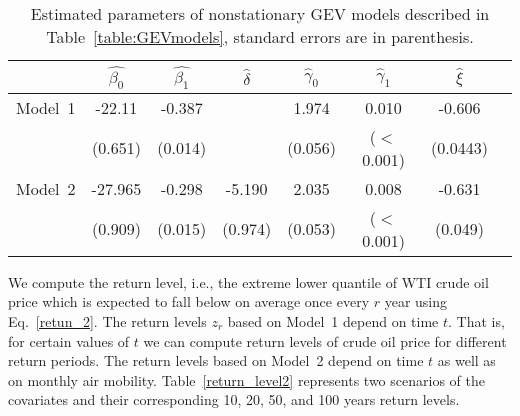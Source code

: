 \documentclass[review]{elsarticle}
\begin{document}
\begin{table*} [!ht]
	\caption{Estimated parameters of nonstationary GEV models described in   Table~\ref{table:GEVmodels}, standard errors are in parenthesis.}
	\label{table:EVT_estmates}	
	\begin{center}
		\begin{tabular}{l*{6}{c}r} \hline
			
		& 	$\hat{\beta_0}$ &  $\hat{\beta_1}$  & $\hat{\delta}$  & $\hat{\gamma}_0$ & $\hat{\gamma}_1$ &  $\hat{\xi}$   \\
			\hline
		Model~1	& -22.11 &   -0.387 &  & 1.974 & 0.010 &  -0.606 \\
			& (0.651) & (0.014) & & (0.056)  & ($<$ 0.001) &   (0.0443) \\
			\hline 
			
			
	Model~2	& -27.965 & -0.298 & -5.190 & 2.035 & 0.008 & -0.631\\
			& (0.909) & (0.015) & (0.974) & (0.053) & ($<$ 0.001) & (0.049)  \\
			\hline 
			
		\end{tabular}
	\end{center}
\end{table*}





We compute the return level, i.e., the extreme lower quantile of WTI crude oil price which is expected to
fall below on average once every $r$ year using Eq.~\ref{retun_2}.
The return levels $z_r$ based on Model~1 depend on time $t$. That is, for certain values of $t$ we can compute return levels of crude oil price for different return periods.
The return levels based on Model~2 depend on time $t$ as well as on monthly air mobility.
Table~\ref{return_level2} represents two scenarios of the covariates and their corresponding 10, 20, 50, and 100 years return levels.
\end{document}
